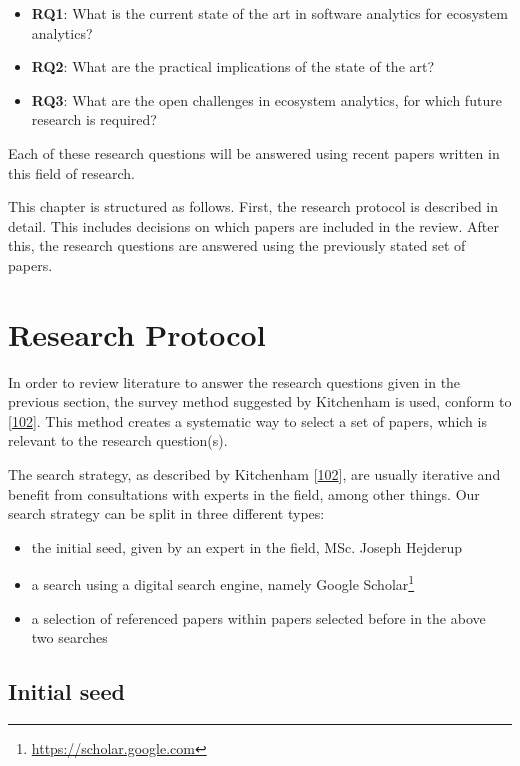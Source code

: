 \documentclass[]{book}
\providecommand{\tightlist}{%
  \setlength{\itemsep}{0pt}\setlength{\parskip}{0pt}}
\let\rmarkdownfootnote\footnote%
\def\footnote{\protect\rmarkdownfootnote}
\begin{document}
\begin{itemize}
\tightlist
\item
  \textbf{RQ1}: What is the current state of the art in software
  analytics for ecosystem analytics?
\item
  \textbf{RQ2}: What are the practical implications of the state of the
  art?
\item
  \textbf{RQ3}: What are the open challenges in ecosystem analytics, for
  which future research is required?
\end{itemize}

Each of these research questions will be answered using recent papers
written in this field of research.

This chapter is structured as follows. First, the research protocol is
described in detail. This includes decisions on which papers are
included in the review. After this, the research questions are answered
using the previously stated set of papers.

\section{Research Protocol}\label{research-protocol-2}

In order to review literature to answer the research questions given in
the previous section, the survey method suggested by Kitchenham is used,
conform to {[}\protect\hyperlink{ref-kitchenham2004procedures}{102}{]}.
This method creates a systematic way to select a set of papers, which is
relevant to the research question(s).

The search strategy, as described by Kitchenham
{[}\protect\hyperlink{ref-kitchenham2004procedures}{102}{]}, are usually
iterative and benefit from consultations with experts in the field,
among other things. Our search strategy can be split in three different
types:

\begin{itemize}
\tightlist
\item
  the initial seed, given by an expert in the field, MSc. Joseph
  Hejderup
\item
  a search using a digital search engine, namely Google
  Scholar\footnote{\url{https://scholar.google.com}}
\item
  a selection of referenced papers within papers selected before in the
  above two searches
\end{itemize}

\subsection{Initial seed}\label{initial-seed}
\end{document}
